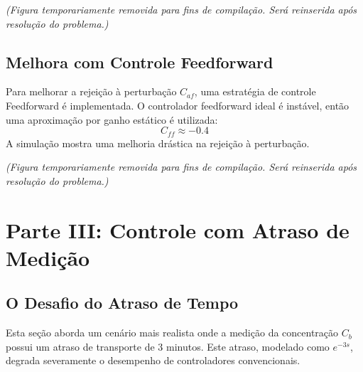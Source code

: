 \documentclass[a4paper,12pt]{report}
\begin{document}
\textit{(Figura temporariamente removida para fins de compilação. Será reinserida após resolução do problema.)}

\section{Melhora com Controle Feedforward}
Para melhorar a rejeição à perturbação \(C_{af}\), uma estratégia de controle Feedforward é implementada. O controlador feedforward ideal é instável, então uma aproximação por ganho estático é utilizada:
\begin{equation}
C_{ff} \approx -0.4
\end{equation}
A simulação mostra uma melhoria drástica na rejeição à perturbação.

\textit{(Figura temporariamente removida para fins de compilação. Será reinserida após resolução do problema.)}

\chapter{Parte III: Controle com Atraso de Medição}
\section{O Desafio do Atraso de Tempo}
Esta seção aborda um cenário mais realista onde a medição da concentração \(C_b\) possui um atraso de transporte de 3 minutos. Este atraso, modelado como \(e^{-3s}\), degrada severamente o desempenho de controladores convencionais.
\end{document}
